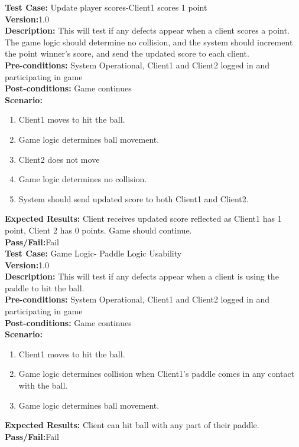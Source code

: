 \noindent \textbf{Test Case:} Update player scores-Client1 scores 1 point\\
\textbf{Version:}1.0\\
\textbf{Description:} This will test if any defects appear when a client scores a point.  The game logic should determine no collision, and the system should increment the point winner's score, and send the updated score to each client.\\
\textbf{Pre-conditions:} System Operational, Client1 and Client2 logged in and participating in game \\
\textbf{Post-conditions:} Game continues\\
\textbf{Scenario:}
\begin{enumerate}
\item Client1 moves to hit the ball.
\item Game logic determines ball movement.
\item Client2 does not move 
\item Game logic determines no collision. 
\item System should send updated score to both Client1 and Client2.
\end{enumerate}
\textbf{Expected Results:} Client receives updated score reflected as Client1 has 1 point, Client 2 has 0 points.  Game should continue.\\
\textbf{Pass/Fail:}Fail\\

\noindent \textbf{Test Case:} Game Logic- Paddle Logic Usability\\
\textbf{Version:}1.0\\
\textbf{Description:} This will test if any defects appear when a client is using the paddle to hit the ball.\\
\textbf{Pre-conditions:} System Operational, Client1 and Client2 logged in and participating in game \\
\textbf{Post-conditions:} Game continues\\
\textbf{Scenario:}
\begin{enumerate}
\item Client1 moves to hit the ball.
\item Game logic determines collision when Client1's paddle comes in any contact with the ball. 
\item Game logic determines ball movement.
\end{enumerate}
\textbf{Expected Results:} Client can hit ball with any part of their paddle.\\
\textbf{Pass/Fail:}Fail\\















